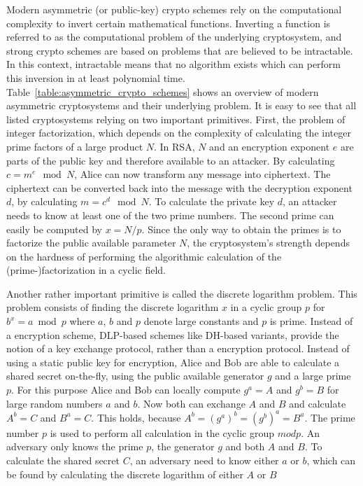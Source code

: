 Modern asymmetric (or public-key) crypto schemes rely on the computational complexity to invert certain mathematical functions. Inverting a function is referred to as the computational problem of the underlying cryptosystem, and strong crypto schemes are based on problems that are believed to be intractable. In this context, intractable means that no algorithm exists which can perform this inversion in at least polynomial time. Table~\ref{table:asymmetric_crypto_schemes} shows an overview of modern asymmetric cryptosystems and their underlying problem. It is easy to see that all listed cryptosystems relying on two important primitives. First, the problem of integer factorization, which depends on the complexity of calculating the integer prime factors of a large product \(N\). In RSA, \(N\) and an encryption exponent \(e\) are parts of the public key and therefore available to an attacker. By calculating \(c = m^e \mod N\), Alice can now transform any message into ciphertext. The ciphertext can be converted back into the message with the decryption exponent \(d\), by calculating \(m = c^d \mod N\). To calculate the private key \(d\), an attacker needs to know at least one of the two prime numbers. The second prime can easily be computed by \(x = N/p\). Since the only way to obtain the primes is to factorize the public available parameter \(N\), the cryptosystem's strength depends on the hardness of performing the algorithmic calculation of the (prime-)factorization in a cyclic field.

Another rather important primitive is called the discrete logarithm problem. This problem consists of finding the discrete logarithm \(x\) in a cyclic group \(p\) for \(b^x = a \bmod p \) where \(a\),  \(b\) and \(p\) denote large constants and \(p\) is prime. Instead of a encryption scheme, \ac{DLP}-based schemes like \ac{DH}-based variants, provide the notion of a key exchange protocol, rather than a encryption protocol. Instead of using a static public key for encryption, Alice and Bob are able to calculate a shared secret on-the-fly, using the public available generator \(g\) and a large prime \(p\). For this purpose Alice and Bob can locally compute \(g^a = A\) and \(g^b = B\) for large random numbers \(a\) and \(b\). Now both can exchange \(A\) and \(B\) and calculate \(A^b = C\) and  \(B^a = C\). This holds, because \(A^b = (g^a)^b = (g^b)^a = B^a\). The prime number \(p\) is used to perform all calculation in the cyclic group \(mod p\). An adversary only knows the prime \(p\), the generator \(g\) and both \(A\) and \(B\). To calculate the shared secret \(C\), an adversary need to know either \(a\) or \(b\), which can be found by calculating the discrete logarithm of either \(A\) or \(B\)


